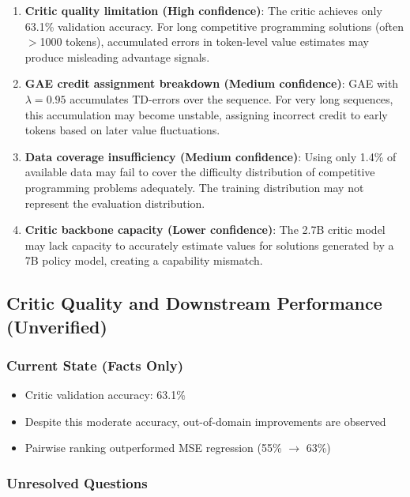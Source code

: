 \begin{enumerate}
    \item \textbf{Critic quality limitation (High confidence)}:
    The critic achieves only 63.1\% validation accuracy. For long competitive programming solutions (often $>$1000 tokens), accumulated errors in token-level value estimates may produce misleading advantage signals.

    \item \textbf{GAE credit assignment breakdown (Medium confidence)}:
    GAE with $\lambda=0.95$ accumulates TD-errors over the sequence. For very long sequences, this accumulation may become unstable, assigning incorrect credit to early tokens based on later value fluctuations.

    \item \textbf{Data coverage insufficiency (Medium confidence)}:
    Using only 1.4\% of available data may fail to cover the difficulty distribution of competitive programming problems adequately. The training distribution may not represent the evaluation distribution.

    \item \textbf{Critic backbone capacity (Lower confidence)}:
    The 2.7B critic model may lack capacity to accurately estimate values for solutions generated by a 7B policy model, creating a capability mismatch.
\end{enumerate}

\subsection{Critic Quality and Downstream Performance (Unverified)}
\label{sec:critic_quality}

\subsubsection{Current State (Facts Only)}

\begin{itemize}[nosep]
    \item Critic validation accuracy: 63.1\%
    \item Despite this moderate accuracy, out-of-domain improvements are observed
    \item Pairwise ranking outperformed MSE regression (55\% $\rightarrow$ 63\%)
\end{itemize}

\subsubsection{Unresolved Questions}


